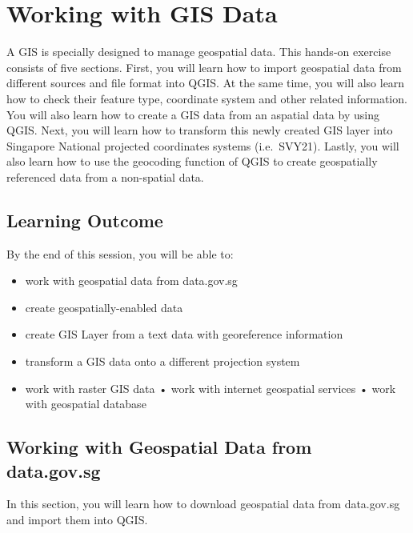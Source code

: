 \documentclass[
  letterpaper,
  DIV=11,
  numbers=noendperiod]{scrreprt}
\providecommand{\tightlist}{%
  \setlength{\itemsep}{0pt}\setlength{\parskip}{0pt}}\usepackage{longtable,booktabs,array}
\begin{document}

\hypertarget{working-with-gis-data}{%
\chapter{Working with GIS Data}\label{working-with-gis-data}}

A GIS is specially designed to manage geospatial data. This hands-on
exercise consists of five sections. First, you will learn how to import
geospatial data from different sources and file format into QGIS. At the
same time, you will also learn how to check their feature type,
coordinate system and other related information. You will also learn how
to create a GIS data from an aspatial data by using QGIS. Next, you will
learn how to transform this newly created GIS layer into Singapore
National projected coordinates systems (i.e.~SVY21). Lastly, you will
also learn how to use the geocoding function of QGIS to create
geospatially referenced data from a non-spatial data.

\hypertarget{learning-outcome}{%
\section{Learning Outcome}\label{learning-outcome}}

By the end of this session, you will be able to:

\begin{itemize}
\tightlist
\item
  work with geospatial data from data.gov.sg
\item
  create geospatially-enabled data
\item
  create GIS Layer from a text data with georeference information
\item
  transform a GIS data onto a different projection system
\item
  work with raster GIS data • work with internet geospatial services •
  work with geospatial database
\end{itemize}

\hypertarget{working-with-geospatial-data-from-data.gov.sg}{%
\section{Working with Geospatial Data from
data.gov.sg}\label{working-with-geospatial-data-from-data.gov.sg}}

In this section, you will learn how to download geospatial data from
data.gov.sg and import them into QGIS.
\end{document}
